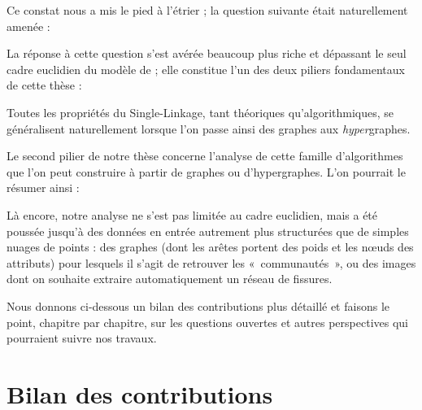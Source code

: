Ce constat nous a mis le pied à l'étrier ; la question suivante était naturellement amenée :

La réponse à cette question s'est avérée beaucoup plus riche et dépassant le seul cadre euclidien du modèle de  ; elle constitue l'un des deux piliers fondamentaux de cette thèse :

Toutes les propriétés du Single-Linkage, tant théoriques qu'algorithmiques, se généralisent naturellement lorsque l'on passe ainsi des graphes aux \emph{hyper}graphes.

Le second pilier de notre thèse concerne l'analyse de cette famille d'algorithmes que l'on peut construire à partir de graphes ou d'hypergraphes. L'on pourrait le résumer ainsi :

Là encore, notre analyse ne s'est pas limitée au cadre euclidien, mais a été poussée jusqu'à des données en entrée autrement plus structurées que de simples nuages de points : des graphes (dont les arêtes portent des poids et les nœuds des attributs) pour lesquels il s'agit de retrouver les «~communautés~», ou des images dont on souhaite extraire automatiquement un réseau de fissures.

Nous donnons ci-dessous un bilan des contributions plus détaillé et faisons le point, chapitre par chapitre, sur les questions ouvertes et autres perspectives qui pourraient suivre nos travaux.

\section{Bilan des contributions}

